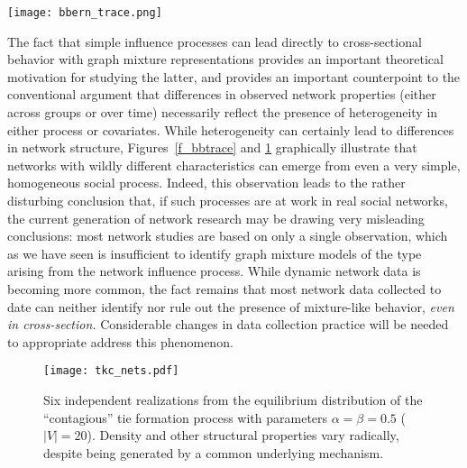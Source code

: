 \documentclass[11pt]{article}
\begin{document}
\begin{sidewaysfigure}
\begin{center}
\texttt{[image: bbern\_trace.png]}
\caption{\label{f_bbtrace} Illustrative realizations of the contagious tie formation process with $|V|=15$, for various values of $\alpha$ and $\beta$.  Black lines show density, red lines Krackhardt connectedness, and green lines edgewise reciprocity; all runs seeded with an exact draw from the appropriate equilibrium distribution.}
\end{center}
\end{sidewaysfigure}

The fact that simple influence processes can lead directly to cross-sectional behavior with graph mixture representations provides an important theoretical motivation for studying the latter, and provides an important counterpoint to the conventional argument that differences in observed network properties (either across groups or over time) necessarily reflect the presence of heterogeneity in either process or covariates.  While heterogeneity can certainly lead to differences in network structure, Figures~\ref{f_bbtrace} and \ref{f_bbexample} graphically illustrate that networks with wildly different characteristics can emerge from even a very simple, homogeneous social process.  Indeed, this observation leads to the rather disturbing conclusion that, if such processes are at work in real social networks, the current generation of network research may be drawing very misleading conclusions: most network studies are based on only a single observation, which as we have seen is insufficient to identify graph mixture models of the type arising from the network influence process.  While dynamic network data is becoming more common, the fact remains that most network data collected to date can neither identify nor rule out the presence of mixture-like behavior, \emph{even in cross-section.}  Considerable changes in data collection practice will be needed to appropriate address this phenomenon.

\begin{figure}
\begin{center}
\texttt{[image: tkc\_nets.pdf]}
\caption{\label{f_bbexample} Six independent realizations from the equilibrium distribution of the ``contagious'' tie formation process with parameters $\alpha=\beta=0.5$ ($|V|=20$).  Density and other structural properties vary radically, despite being generated by a common underlying mechanism.}
\end{center}
\end{figure}
\end{document}
